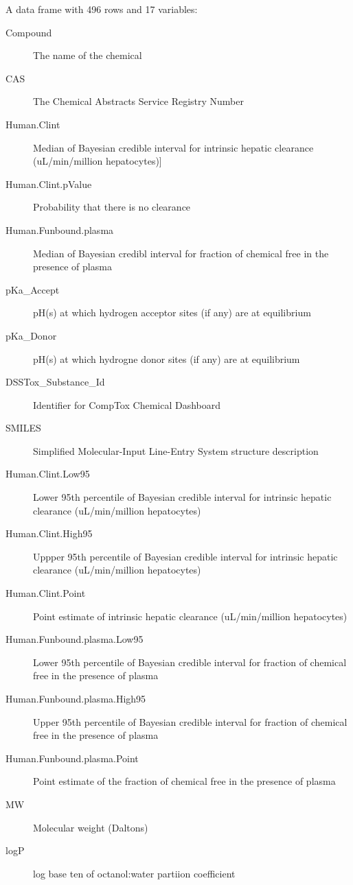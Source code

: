 \documentclass[a4paper]{book}
\begin{document}
%
\begin{Format}
A data frame with 496 rows and 17 variables:
\begin{description}

\item[Compound] The name of the chemical
\item[CAS] The Chemical Abstracts Service Registry Number
\item[Human.Clint] Median of Bayesian credible interval for intrinsic
hepatic clearance (uL/min/million hepatocytes)]
\item[Human.Clint.pValue] Probability that there is no clearance
\item[Human.Funbound.plasma] Median of Bayesian credibl interval for
fraction of chemical free in the presence of plasma
\item[pKa\_Accept] pH(s) at which hydrogen acceptor sites (if any) are at
equilibrium
\item[pKa\_Donor] pH(s) at which hydrogne donor sites (if any) are at
equilibrium
\item[DSSTox\_Substance\_Id] Identifier for CompTox Chemical Dashboard
\item[SMILES] Simplified Molecular-Input Line-Entry System structure
description
\item[Human.Clint.Low95] Lower 95th percentile of Bayesian credible
interval for intrinsic hepatic clearance (uL/min/million hepatocytes)
\item[Human.Clint.High95] Uppper 95th percentile of Bayesian credible
interval for intrinsic hepatic clearance (uL/min/million hepatocytes)
\item[Human.Clint.Point] Point estimate of intrinsic hepatic clearance
(uL/min/million hepatocytes)
\item[Human.Funbound.plasma.Low95] Lower 95th percentile of Bayesian credible
interval for fraction of chemical free in the presence of plasma
\item[Human.Funbound.plasma.High95] Upper 95th percentile of Bayesian credible
interval for fraction of chemical free in the presence of plasma
\item[Human.Funbound.plasma.Point] Point estimate of the fraction of
chemical free in the presence of plasma
\item[MW] Molecular weight (Daltons)
\item[logP] log base ten of octanol:water partiion coefficient

\end{description}

\end{Format}
\end{document}
